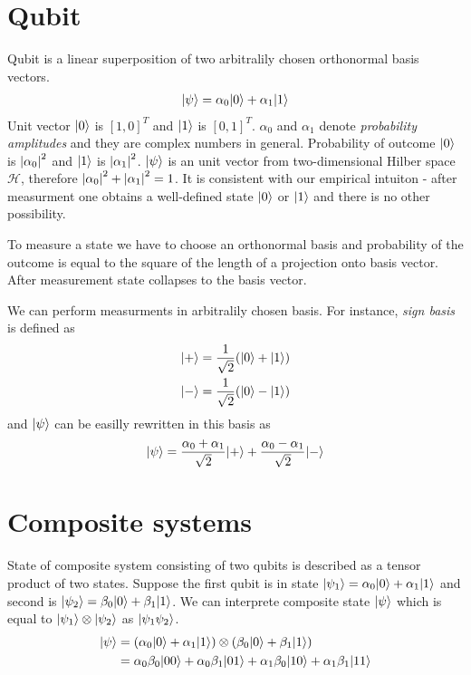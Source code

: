 \begin{multicols*}{2}
\section{Qubit}
\indent
Qubit is a linear superposition of two arbitralily chosen orthonormal basis vectors. 
\begin{align*}
{\left\vert{\psi}\right\rangle} = \alpha_0{\left\vert{0}\right\rangle} + \alpha_1{\left\vert{1}\right\rangle}
\end{align*}
Unit vector ${\left\vert{0}\right\rangle}$ is $[1, 0]^T$ and ${\left\vert{1}\right\rangle}$ is $[0,1]^T$. $\alpha_0$ and $\alpha_1$ denote \textit{probability amplitudes} and they are complex numbers in general. Probability of outcome ${\left\vert{0}\right\rangle}$ is $\left| \alpha_0 \right|^2$ and ${\left\vert{1}\right\rangle}$ is $\left| \alpha_1 \right|^2$. ${\left\vert{\psi}\right\rangle}$ is an unit vector from two-dimensional Hilber space $\mathcal{H}$, therefore $\left| \alpha_0 \right|^2 + \left| \alpha_1 \right|^2 = 1$. It is consistent with our empirical intuiton - after measurment one obtains a well-defined state ${\left\vert{0}\right\rangle}$ or ${\left\vert{1}\right\rangle}$ and there is no other possibility.

To measure a state we have to choose an orthonormal basis and probability of the outcome is equal to the square of the length of a projection onto basis vector. After measurement state collapses to the basis vector.

We can perform measurments in arbitralily chosen basis. For instance, \textit{sign basis} is defined as
\begin{align*}
{\left\vert{+}\right\rangle} = \frac{1}{\sqrt{2}}({\left\vert{0}\right\rangle} + {\left\vert{1}\right\rangle})\\
{\left\vert{-}\right\rangle} = \frac{1}{\sqrt{2}}({\left\vert{0}\right\rangle} - {\left\vert{1}\right\rangle})
\end{align*}
and ${\left\vert{\psi}\right\rangle}$ can be easilly rewritten in this basis as
\begin{align*}
{\left\vert{\psi}\right\rangle} = \frac{\alpha_0 + \alpha_1}{\sqrt{2}}{\left\vert{+}\right\rangle}+\frac{\alpha_0-\alpha_1}{\sqrt{2}}{\left\vert{-}\right\rangle}
\end{align*}
\section{Composite systems}
State of composite system consisting of two qubits is described as a tensor product of two states. Suppose the first qubit is in state ${\left\vert{\psi_1}\right\rangle} = \alpha_0{\left\vert{0}\right\rangle} + \alpha_1{\left\vert{1}\right\rangle}$ and second is ${\left\vert{\psi_2}\right\rangle} = \beta_0{\left\vert{0}\right\rangle} + \beta_1{\left\vert{1}\right\rangle}$. We can interprete composite state ${\left\vert{\psi}\right\rangle}$ which is equal to ${\left\vert{\psi_1}\right\rangle}\otimes{\left\vert{\psi_2}\right\rangle}$ as ${\left\vert{\psi_1\psi_2}\right\rangle}$.
\begin{align}
\begin{split}
\label{eq:composite}
{\left\vert{\psi}\right\rangle} &=  (\alpha_0{\left\vert{0}\right\rangle} + \alpha_1{\left\vert{1}\right\rangle})\otimes(\beta_0{\left\vert{0}\right\rangle} + \beta_1{\left\vert{1}\right\rangle}) \\
&=\alpha_0\beta_0{\left\vert{00}\right\rangle} + \alpha_0\beta_1{\left\vert{01}\right\rangle} + \alpha_1\beta_0{\left\vert{10}\right\rangle} + \alpha_1\beta_1{\left\vert{11}\right\rangle}
\end{split}
\end{align}


\end{multicols*}
